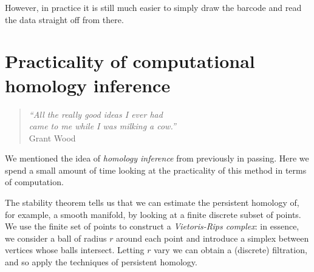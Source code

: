 \documentclass[12pt]{article}
\numberwithin{equation}{subsection}
\numberwithin{theorem}{subsection}
\numberwithin{lemma}{subsection}
\numberwithin{corollary}{subsection}
\numberwithin{definition}{subsection}
\numberwithin{example}{subsection}
\numberwithin{note}{subsection}
\begin{document}
            However, in practice it is still much easier to simply draw the barcode and read the data straight off from there.
        




















    \section{Practicality of computational homology inference} %
    \label{sec:persistent_homology_of_a_cow}

        \begin{quotation}
            \raggedleft
            \emph{``All the really good ideas I ever had\\ came to me while I was milking a cow.''}\\
            Grant Wood
        \end{quotation}

        We mentioned the idea of \emph{homology inference} from \cite[\S4]{CohenSteiner:2007is} previously in passing.
        Here we spend a small amount of time looking at the practicality of this method in terms of computation.

        \bigskip

        The stability theorem tells us that we can estimate the persistent homology of, for example, a smooth manifold, by looking at a finite discrete subset of points.
        We use the finite set of points to construct a \emph{Vietoris-Rips complex}: in essence, we consider a ball of radius $r$ around each point and introduce a simplex between vertices whose balls intersect.
        Letting $r$ vary we can obtain a (discrete) filtration, and so apply the techniques of persistent homology.
        
\end{document}

